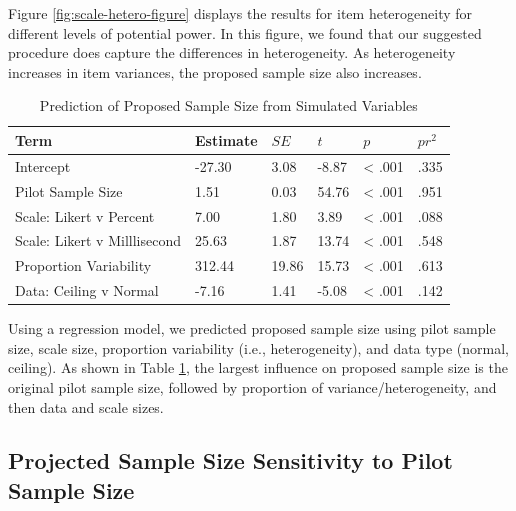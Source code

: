 \documentclass[
  man]{apa7}
\begin{document}
Figure \ref{fig:scale-hetero-figure} displays the results for item heterogeneity for different levels of potential power. In this figure, we found that our suggested procedure does capture the differences in heterogeneity. As heterogeneity increases in item variances, the proposed sample size also increases.

\begin{table}[tbp]

\begin{center}
\begin{threeparttable}

\caption{\label{tab:table-predict-largest}Prediction of Proposed Sample Size from Simulated Variables}

\begin{tabular}{llllll}
\toprule
Term & Estimate & $SE$ & $t$ & $p$ & $pr^2$\\
\midrule
Intercept & -27.30 & 3.08 & -8.87 & < .001 & .335\\
Pilot Sample Size & 1.51 & 0.03 & 54.76 & < .001 & .951\\
Scale: Likert v Percent & 7.00 & 1.80 & 3.89 & < .001 & .088\\
Scale: Likert v Milllisecond & 25.63 & 1.87 & 13.74 & < .001 & .548\\
Proportion Variability & 312.44 & 19.86 & 15.73 & < .001 & .613\\
Data: Ceiling v Normal & -7.16 & 1.41 & -5.08 & < .001 & .142\\
\bottomrule
\end{tabular}

\end{threeparttable}
\end{center}

\end{table}

Using a regression model, we predicted proposed sample size using pilot sample size, scale size, proportion variability (i.e., heterogeneity), and data type (normal, ceiling). As shown in Table \ref{tab:table-predict-largest}, the largest influence on proposed sample size is the original pilot sample size, followed by proportion of variance/heterogeneity, and then data and scale sizes.

\hypertarget{projected-sample-size-sensitivity-to-pilot-sample-size}{%
\subsection{Projected Sample Size Sensitivity to Pilot Sample Size}\label{projected-sample-size-sensitivity-to-pilot-sample-size}}
\end{document}
